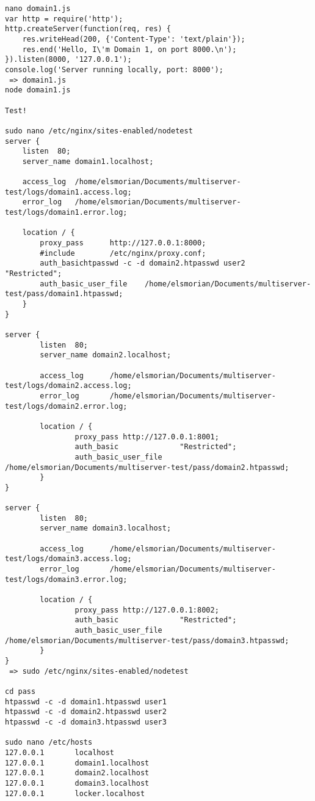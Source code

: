 \documentclass[A4paper,11pt]{article}
\begin{document}
\begin{lstlisting}
nano domain1.js
var http = require('http');
http.createServer(function(req, res) {
	res.writeHead(200, {'Content-Type': 'text/plain'});
	res.end('Hello, I\'m Domain 1, on port 8000.\n');
}).listen(8000, '127.0.0.1');
console.log('Server running locally, port: 8000');
 => domain1.js
node domain1.js

Test!

sudo nano /etc/nginx/sites-enabled/nodetest
server {
	listen	80;
	server_name domain1.localhost;

	access_log 	/home/elsmorian/Documents/multiserver-test/logs/domain1.access.log;
	error_log	/home/elsmorian/Documents/multiserver-test/logs/domain1.error.log;
	
	location / {
		proxy_pass 		http://127.0.0.1:8000;
		#include 		/etc/nginx/proxy.conf;
		auth_basichtpasswd -c -d domain2.htpasswd user2		"Restricted";
		auth_basic_user_file	/home/elsmorian/Documents/multiserver-test/pass/domain1.htpasswd;
	}
}

server {
        listen  80;
        server_name domain2.localhost;

        access_log      /home/elsmorian/Documents/multiserver-test/logs/domain2.access.log;
        error_log       /home/elsmorian/Documents/multiserver-test/logs/domain2.error.log;

        location / {
                proxy_pass http://127.0.0.1:8001;
                auth_basic              "Restricted";
                auth_basic_user_file    /home/elsmorian/Documents/multiserver-test/pass/domain2.htpasswd;
        }
}

server {
        listen  80;
        server_name domain3.localhost;

        access_log      /home/elsmorian/Documents/multiserver-test/logs/domain3.access.log;
        error_log       /home/elsmorian/Documents/multiserver-test/logs/domain3.error.log;

        location / {
                proxy_pass http://127.0.0.1:8002;
                auth_basic              "Restricted";
                auth_basic_user_file    /home/elsmorian/Documents/multiserver-test/pass/domain3.htpasswd;
        }
}
 => sudo /etc/nginx/sites-enabled/nodetest

cd pass
htpasswd -c -d domain1.htpasswd user1
htpasswd -c -d domain2.htpasswd user2
htpasswd -c -d domain3.htpasswd user3

sudo nano /etc/hosts
127.0.0.1       localhost
127.0.0.1       domain1.localhost
127.0.0.1       domain2.localhost
127.0.0.1       domain3.localhost
127.0.0.1       locker.localhost



\end{lstlisting}
\end{document}
